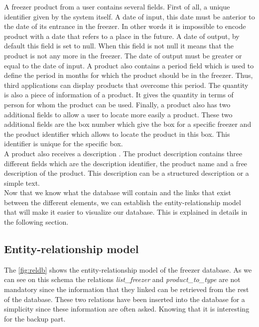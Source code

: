 A freezer product from a user contains several fields. First of all, a unique identifier given by the system itself. A date of input, this date must be anterior to the date of its entrance in the freezer. In other words it is impossible to encode product with a date that refers to a place in the future. A date of output, by default this field is set to null. When this field is not null it means that the product is not any more in the freezer. The date of output must be greater or equal to the date of input. A product also contains a period field which is used to define the period in months for which the product should be in the freezer. Thus, third applications can display products that overcome this period. The quantity is also a piece of information of a product. It gives  the quantity in terms of person for whom the product can be used. Finally, a product also has two additional fields to allow a user to locate more easily a product. These two additional fields are the box number which give the box for a specific freezer and the product identifier which allows to locate the product in this box. This identifier is unique for the specific box.\\

A product also receives a description . The product description contains three different fields which are the description identifier, the product name and a free description of the product. This description can be a structured description or a simple text. \\

Now that we know what the database will contain and the links that exist between the different elements, we can establish the entity-relationship model that will make it easier to visualize our database. This is explained in details in the following section.

\subsection{Entity-relationship model}
The \autoref{fig:reldb} shows the entity-relationship model of the freezer database. As we can see on this schema the relations \textit{list\_freezer} and \textit{product\_to\_type} are not mandatory since the information that they linked can be retrieved from the rest of the database. These two relations have been inserted into the database for a simplicity since these information are often asked. Knowing that it is interesting for the backup part. \\

